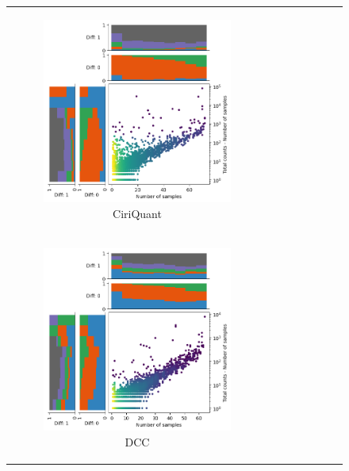 \begin{figure}[ht]
\begin{tabular}{cc}
\begin{subfigure}{.5\textwidth}
            \includegraphics[width=\linewidth]{chapters/4_results_and_discussion/figures/detection/density/ciriquant.png}
            \caption{CiriQuant}
            \label{fig:detection_density_ciriquant}
        \end{subfigure} \\
        \begin{subfigure}{.5\textwidth}
            \centering

            \includegraphics[width=\linewidth]{chapters/4_results_and_discussion/figures/detection/density/dcc.png}
            \caption{DCC}
            \label{fig:detection_density_dcc}
        \end{subfigure}
         &
        \begin{subfigure}{.5\textwidth}
            \centering


\end{subfigure}
\end{tabular}
\end{figure}
